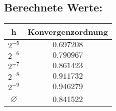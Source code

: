 \documentclass[10pt,oneside,a4paper]{scrartcl}
\begin{document}
    \subsection*{Berechnete Werte:}
    
    \begin{center}
        \begin{tabular}[htbp]{c|c}
        h & Konvergenzordnung \\
        \hline
        $2^{-5}$ & $0.697208$ \\
        $2^{-6}$ & $0.790967$ \\
        $2^{-7}$ & $0.861423$ \\
        $2^{-8}$ & $0.911732$ \\
        $2^{-9}$ & $0.946279$ \\
        \hline
        \hline
        $\varnothing$ & 0.841522
        \end{tabular}
    \end{center}
\end{document}

